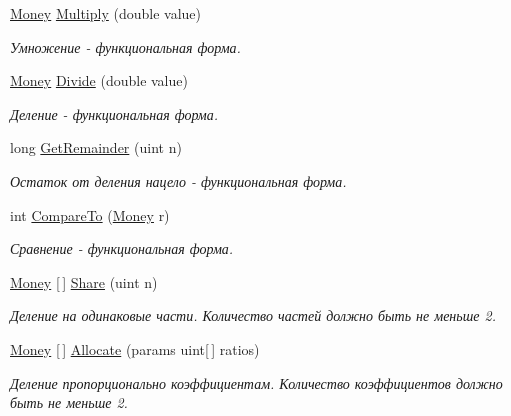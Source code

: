 \begin{DoxyCompactItemize}
\mbox{\hyperlink{struct_f_b_a_1_1_money}{Money}} \mbox{\hyperlink{struct_f_b_a_1_1_money_afc1d36bb92c528e150548fe745650c95}{Multiply}} (double value)
\begin{DoxyCompactList}\small\item\em Умножение -\/ функциональная форма. ~\newline
\end{DoxyCompactList}\item 
\mbox{\hyperlink{struct_f_b_a_1_1_money}{Money}} \mbox{\hyperlink{struct_f_b_a_1_1_money_a121b21f5f3554e8460861e611fbac8cd}{Divide}} (double value)
\begin{DoxyCompactList}\small\item\em Деление -\/ функциональная форма. \end{DoxyCompactList}\item 
long \mbox{\hyperlink{struct_f_b_a_1_1_money_a985f9e6a97bd918c16d9cb5275122755}{Get\+Remainder}} (uint n)
\begin{DoxyCompactList}\small\item\em Остаток от деления нацело -\/ функциональная форма. \end{DoxyCompactList}\item 
int \mbox{\hyperlink{struct_f_b_a_1_1_money_aa098429e1734d7103df5f46245ec255d}{Compare\+To}} (\mbox{\hyperlink{struct_f_b_a_1_1_money}{Money}} r)
\begin{DoxyCompactList}\small\item\em Сравнение -\/ функциональная форма. \end{DoxyCompactList}\item 
\mbox{\hyperlink{struct_f_b_a_1_1_money}{Money}} \mbox{[}$\,$\mbox{]} \mbox{\hyperlink{struct_f_b_a_1_1_money_afa6894e26ab6c20cb7f0914d4187c96a}{Share}} (uint n)
\begin{DoxyCompactList}\small\item\em Деление на одинаковые части. Количество частей должно быть не меньше 2. \end{DoxyCompactList}\item 
\mbox{\hyperlink{struct_f_b_a_1_1_money}{Money}} \mbox{[}$\,$\mbox{]} \mbox{\hyperlink{struct_f_b_a_1_1_money_aff15a479a5f4738af933f84a8bc8ef51}{Allocate}} (params uint\mbox{[}$\,$\mbox{]} ratios)
\begin{DoxyCompactList}\small\item\em Деление пропорционально коэффициентам. Количество коэффициентов должно быть не меньше 2. \end{DoxyCompactList}\item 

\end{DoxyCompactItemize}
